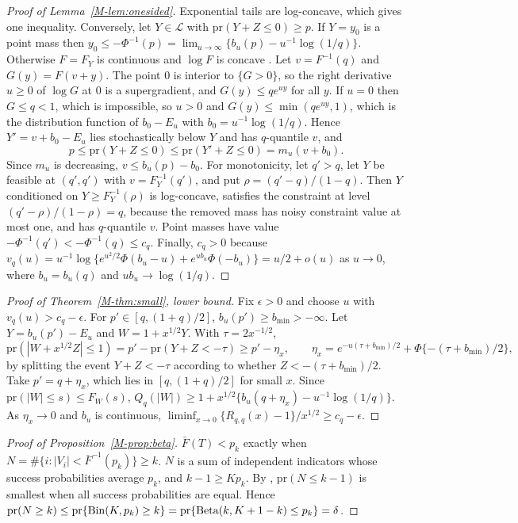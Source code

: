 \documentclass[11pt]{article}
\newcommand{\pr}{\mathrm{pr}}
\newcommand{\LC}{\mathcal{L}}
\begin{document}
\begin{proof}[Proof of Lemma~\ref{M-lem:onesided}]
Exponential tails are log-concave, which gives one inequality. Conversely, let $Y \in \LC$ with $\pr(Y + Z \le 0) \ge p$. If $Y = y_0$ is a point mass then $y_0 \le -\Phi^{-1}(p) = \lim_{u\to\infty}\{b_u(p) - u^{-1}\log(1/q)\}$. Otherwise $F = F_Y$ is continuous and $\log F$ is concave \citep{prekopa1973}. Let $v = F^{-1}(q)$ and $G(y) = F(v + y)$. The point $0$ is interior to $\{G > 0\}$, so the right derivative $u \ge 0$ of $\log G$ at $0$ is a supergradient, and $G(y) \le q e^{uy}$ for all $y$. If $u = 0$ then $G \le q < 1$, which is impossible, so $u > 0$ and $G(y) \le \min(qe^{uy}, 1)$, which is the distribution function of $b_0 - E_u$ with $b_0 = u^{-1}\log(1/q)$. Hence $Y' = v + b_0 - E_u$ lies stochastically below $Y$ and has $q$-quantile $v$, and
\[
p \le \pr(Y + Z \le 0) \le \pr(Y' + Z \le 0) = m_u(v + b_0).
\]
Since $m_u$ is decreasing, $v \le b_u(p) - b_0$. For monotonicity, let $q' > q$, let $Y$ be feasible at $(q', q')$ with $v = F_Y^{-1}(q')$, and put $\rho = (q' - q)/(1-q)$. Then $Y$ conditioned on $Y \ge F_Y^{-1}(\rho)$ is log-concave, satisfies the constraint at level $(q' - \rho)/(1-\rho) = q$, because the removed mass has noisy constraint value at most one, and has $q$-quantile $v$. Point masses have value $-\Phi^{-1}(q') < -\Phi^{-1}(q) \le c_q$. Finally, $c_q > 0$ because $v_q(u) = u^{-1}\log\{e^{u^2/2}\Phi(b_u - u) + e^{u b_u}\Phi(-b_u)\} = u/2 + o(u)$ as $u \to 0$, where $b_u = b_u(q)$ and $u b_u \to \log(1/q)$.
\end{proof}

\begin{proof}[Proof of Theorem~\ref{M-thm:small}, lower bound]
Fix $\epsilon > 0$ and choose $u$ with $v_q(u) > c_q - \epsilon$. For $p' \in [q, (1+q)/2]$, $b_u(p') \ge b_{\min} > -\infty$. Let $Y = b_u(p') - E_u$ and $W = 1 + x^{1/2}Y$. With $\tau = 2x^{-1/2}$,
\[
\pr(|W+x^{1/2}Z| \le 1) = p' - \pr(Y + Z < -\tau) \ge p' - \eta_x, \qquad \eta_x = e^{-u(\tau + b_{\min})/2} + \Phi\{-(\tau + b_{\min})/2\},
\]
by splitting the event $Y + Z < -\tau$ according to whether $Z < -(\tau + b_{\min})/2$. Take $p' = q + \eta_x$, which lies in $[q, (1+q)/2]$ for small $x$. Since $\pr(|W| \le s) \le F_W(s)$, $Q_q(|W|) \ge 1 + x^{1/2}\{b_u(q + \eta_x) - u^{-1}\log(1/q)\}$. As $\eta_x \to 0$ and $b_u$ is continuous, $\liminf_{x\to0}\{R_{q,q}(x) - 1\}/x^{1/2} \ge c_q - \epsilon$.
\end{proof}

\begin{proof}[Proof of Proposition~\ref{M-prop:beta}]
$\bar F(T) < p_k$ exactly when $N = \#\{i : |V_i| < \bar F^{-1}(p_k)\} \ge k$. $N$ is a sum of independent indicators whose success probabilities average $p_k$, and $k - 1 \ge Kp_k$. By \citet{hoeffding1956}, $\pr(N \le k-1)$ is smallest when all success probabilities are equal. Hence $\pr(N \ge k) \le \pr\{{\rm Bin}(K, p_k) \ge k\} = \pr\{{\rm Beta}(k, K+1-k) \le p_k\} = \delta$.
\end{proof}
\end{document}
